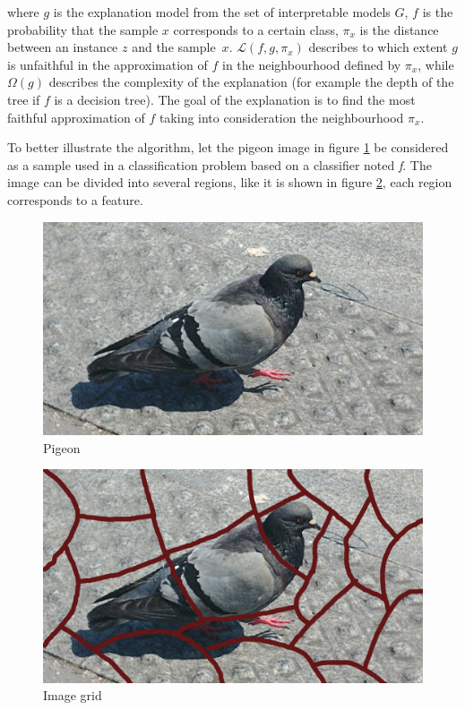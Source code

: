 \noindent where $g$ is the explanation model from the set of interpretable models $G$, $f$ is the probability that the sample $x$ corresponds to a certain class, $\pi_x$ is the distance between an instance $z$ and the sample~$x$. $\mathcal{L}(f, g, \pi_x)$ describes to which extent $g$ is unfaithful in the approximation of $f$ in the neighbourhood defined by $\pi_x$, while $\Omega(g)$ describes the complexity of the explanation (for example the depth of the tree if $f$ is a decision tree). The goal of the explanation is to find the most faithful approximation of $f$ taking into consideration the neighbourhood $\pi_x$.

To better illustrate the algorithm, let the pigeon image in figure \ref{fig:limepigeon} be considered as a sample used in a classification problem based on a classifier noted \textit{f}. The image can be divided into several regions, like it is shown in figure \ref{fig:limediv}, each region corresponds to a feature.

\begin{minipage}{.45\textwidth}
    \begin{figure}[H]
        \centering
        \includegraphics[width=\linewidth]{images/lime/pigeon}
        \caption{Pigeon}
        \label{fig:limepigeon}
    \end{figure}
\end{minipage}
\begin{minipage}{.45\textwidth}
    \begin{figure}[H]
        \centering
        \includegraphics[width=\linewidth]{images/lime/grid}
        \caption{Image grid}
        \label{fig:limediv}
    \end{figure}
\end{minipage}
\vspace{0.5cm}

